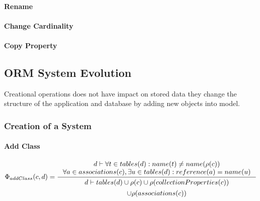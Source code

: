 \documentclass[11pt]{article}
\begin{document}
\paragraph{Rename}
\paragraph{Change Cardinality}
\paragraph{Copy Property}


\subsection{ORM System Evolution}
Creational operations does not have impact on stored data they change the structure of the application and database by adding new objects into model.

\subsubsection{Creation of a System}
\paragraph{Add Class}

$
\Phi_{addClass}(c, d) = \inference{d \vdash \forall t \in tables(d) : name(t) \neq name(\rho(c)) \\
	\forall a \in associations(c), \exists u \in  tables(d) : reference(a) = name(u) 
}{
\begin{gathered}
d \vdash  tables(d) \cup \rho(c) \cup \rho(collectionProperties(c)) \\ \cup \rho(associations(c))
\end{gathered}
}
$
\end{document}
